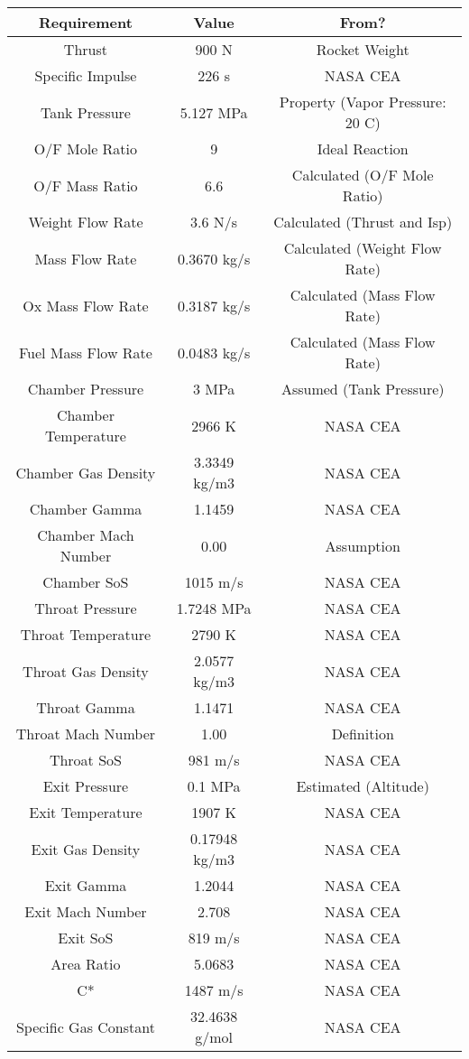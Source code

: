 \documentclass[12pt, letter paper]{article}
\begin{document}
	\begin{center}
		\begin{tabular}{|c |c |c |}
			\hline
			\textbf{Requirement} & \textbf{Value} & \textbf{From?} \\ \hline
			Thrust & 900 N & Rocket Weight \\ \hline
			Specific Impulse & 226 s & NASA CEA \\ \hline
			Tank Pressure & 5.127 MPa & Property (Vapor Pressure: 20 C) \\ \hline
			O/F Mole Ratio & 9 & Ideal Reaction \\ \hline
			O/F Mass Ratio & 6.6 & Calculated (O/F Mole Ratio) \\ \hline 
			Weight Flow Rate & 3.6 N/s & Calculated (Thrust and Isp)\\ \hline
			Mass Flow Rate & 0.3670 kg/s & Calculated (Weight Flow Rate) \\ \hline
			Ox Mass Flow Rate & 0.3187 kg/s & Calculated (Mass Flow Rate) \\ \hline
			Fuel Mass Flow Rate & 0.0483 kg/s & Calculated (Mass Flow Rate) \\ \hline
			Chamber Pressure & 3 MPa & Assumed (Tank Pressure) \\ \hline
			Chamber Temperature & 2966 K & NASA CEA \\ \hline
			Chamber Gas Density & 3.3349 kg/m3 & NASA CEA \\ \hline
			Chamber Gamma & 1.1459 & NASA CEA \\ \hline
			Chamber Mach Number & 0.00 & Assumption \\ \hline
			Chamber SoS & 1015 m/s & NASA CEA \\ \hline
			Throat Pressure & 1.7248 MPa & NASA CEA \\ \hline
			Throat Temperature & 2790 K & NASA CEA \\ \hline
			Throat Gas Density & 2.0577 kg/m3 & NASA CEA \\ \hline
			Throat Gamma & 1.1471 & NASA CEA \\ \hline
			Throat Mach Number & 1.00 & Definition \\ \hline
			Throat SoS & 981 m/s & NASA CEA \\ \hline
			Exit Pressure & 0.1 MPa & Estimated (Altitude) \\ \hline
			Exit Temperature & 1907 K & NASA CEA \\ \hline
			Exit Gas Density & 0.17948 kg/m3 & NASA CEA \\ \hline
			Exit Gamma & 1.2044 & NASA CEA \\ \hline
			Exit Mach Number & 2.708 & NASA CEA \\ \hline
			Exit SoS & 819 m/s & NASA CEA \\ \hline
			Area Ratio & 5.0683 & NASA CEA \\ \hline
			C* & 1487 m/s & NASA CEA \\ \hline
			Specific Gas Constant & 32.4638 g/mol & NASA CEA \\ \hline
			
			
			
			
			
			
		\end{tabular}
	\end{center}
\end{document}
